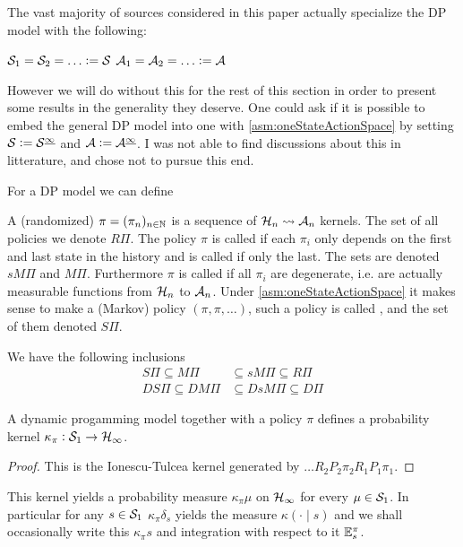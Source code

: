 \documentclass{article}
\begin{document}
The vast majority of sources considered in this paper actually specialize
the DP model with the following:
\begin{asm}
  $\Cal{S}_1 = \Cal{S}_2 = \dots \defeq \Cal{S}$
  $\Cal{A}_1 = \Cal{A}_2 = \dots \defeq \Cal{A}$
  \label{asm:oneStateActionSpace}
\end{asm}
However we will do without this for the rest of this section in order to
present some results in the generality they deserve.
One could ask if it is possible to embed the general DP model into one
with \cref{asm:oneStateActionSpace} by setting
$\mathcal{S} \vcentcolon= \mathcal{S}^{\underline{\infty}}$ and
$\mathcal{A} \vcentcolon= \mathcal{A}^{\underline{\infty}}$.
I was not able to find discussions about this in litterature,
and chose not to pursue this end. %

For a DP model we can define
\begin{defn}[Policy]
  A (randomized)  $\pi = (\pi_n)_{n \in \mathbb{N}}$
  is a sequence of $\mathcal{H}_n \leadsto \mathcal{A}_n$ kernels.
  The set of all policies we denote $R\Pi$.
  The policy $\pi$ is called  if each $\pi_i$ only depends
  on the first and last state in the history
  and is called  if only the last.
  The sets are denoted $sM\Pi$ and $M\Pi$.
  Furthermore $\pi$ is called  if all $\pi_i$
  are degenerate, i.e. are actually measurable functions from
  $\mathcal{H}_n$ to $\mathcal{A}_n$. 
  Under \cref{asm:oneStateActionSpace}
  it makes sense to make a (Markov) policy $(\pi, \pi, \dots)$,
  such a policy is called ,
  and the set of them denoted $S\Pi$.
\end{defn}
We have the following inclusions
\begin{align*}
  S\Pi \subseteq M\Pi &\subseteq sM\Pi \subseteq R\Pi
  \\ DS\Pi \subseteq DM\Pi &\subseteq DsM\Pi \subseteq D\Pi
\end{align*}

\begin{prop}
A dynamic progamming model together with a policy $\pi$ defines a
probability kernel $\kappa_\pi : \mathcal{S}_1 \to \mathcal{H}_\infty$.
\end{prop}
\begin{proof}
  This is the Ionescu-Tulcea kernel generated by
  $\dots R_2 P_2 \pi_2 R_1 P_1 \pi_1$.
\end{proof}
This kernel yields a probability measure $\kappa_\pi \mu$ on $\mathcal{H}_\infty$
for every $\mu \in \mathcal{S}_1$. In particular for any $s \in \mathcal{S}_1$
$\kappa_\pi \delta_s$ yields the measure $\kappa(\cdot \mid s)$
and we shall occasionally write this $\kappa_\pi s$ and
integration with respect to it $\mathbb{E}^\pi_s$.
\end{document}
